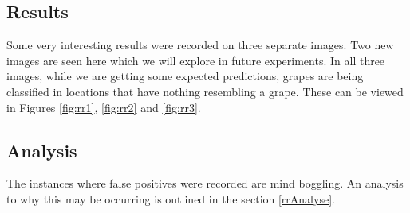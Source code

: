 \subsection*{Results}
Some very interesting results were recorded on three separate images. Two new images are seen
here which we will explore in future experiments. In all three images, while we
are getting some expected predictions, grapes are being classified in locations
that have nothing resembling a grape. These can be viewed in Figures
\ref{fig:rr1}, \ref{fig:rr2} and \ref{fig:rr3}.

\subsection*{Analysis}
The instances where false positives were recorded are mind boggling.
An analysis to why this may be occurring is outlined in the section \ref{rrAnalyse}.

